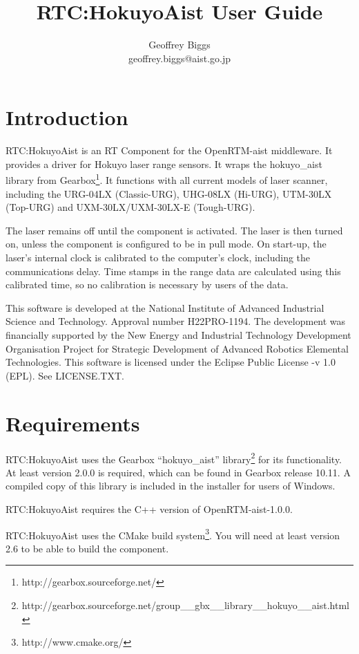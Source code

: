 \documentclass[a4paper,10pt]{article}
\title{RTC:HokuyoAist User Guide}
\author{Geoffrey Biggs\\
geoffrey.biggs@aist.go.jp}
\begin{document}
\maketitle

\section{Introduction}
\label{sec:intro}

RTC:HokuyoAist is an RT Component for the OpenRTM-aist middleware. It provides
a driver for Hokuyo laser range sensors. It wraps the hokuyo\_aist library from
Gearbox\footnote{http://gearbox.sourceforge.net/}. It functions with all
current models of laser scanner, including the URG-04LX (Classic-URG), UHG-08LX
(Hi-URG), UTM-30LX (Top-URG) and UXM-30LX/UXM-30LX-E (Tough-URG).

The laser remains off until the component is activated. The laser is then
turned on, unless the component is configured to be in pull mode. On start-up,
the laser's internal clock is calibrated to the computer's clock, including the
communications delay. Time stamps in the range data are calculated using this
calibrated time, so no calibration is necessary by users of the data.

This software is developed at the National Institute of Advanced Industrial
Science and Technology. Approval number H22PRO-1194. The development was
financially supported by the New Energy and Industrial Technology Development
Organisation Project for Strategic Development of Advanced Robotics Elemental
Technologies.  This software is licensed under the Eclipse Public License -v
1.0 (EPL). See LICENSE.TXT.

\section{Requirements}
\label{sec:requirements}

RTC:HokuyoAist uses the Gearbox ``hokuyo\_aist''
library\footnote{http://gearbox.sourceforge.net/group\_\_gbx\_\_library\_\_hokuyo\_\_aist.html}
for its functionality. At least version 2.0.0 is required, which can be found
in Gearbox release 10.11. A compiled copy of this library is included in the
installer for users of Windows.

RTC:HokuyoAist requires the C++ version of OpenRTM-aist-1.0.0.

RTC:HokuyoAist uses the CMake build system\footnote{http://www.cmake.org/}. You
will need at least version 2.6 to be able to build the component.
\end{document}
